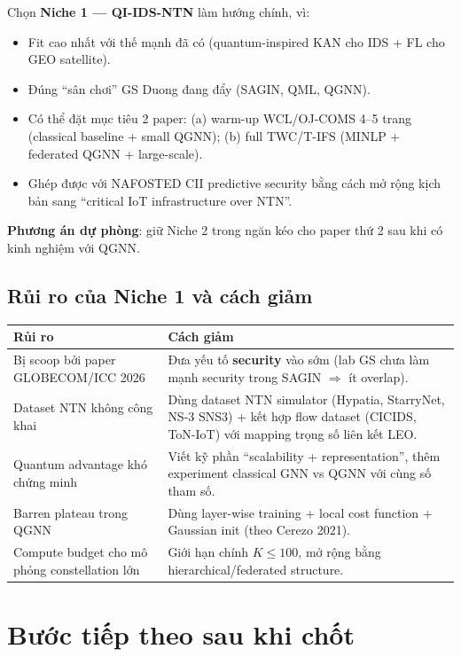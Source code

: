 \documentclass[11pt,a4paper]{article}
\begin{document}
\begin{greenbox}
Chọn \textbf{Niche 1 --- QI-IDS-NTN} làm hướng chính, vì:
\begin{itemize}
  \item Fit cao nhất với thế mạnh đã có (quantum-inspired KAN cho IDS + FL cho GEO satellite).
  \item Đúng ``sân chơi'' GS Duong đang đẩy (SAGIN, QML, QGNN).
  \item Có thể đặt mục tiêu 2 paper: (a) warm-up WCL/OJ-COMS 4--5 trang (classical baseline + small QGNN); (b) full TWC/T-IFS (MINLP + federated QGNN + large-scale).
  \item Ghép được với NAFOSTED CII predictive security bằng cách mở rộng kịch bản sang ``critical IoT infrastructure over NTN''.
\end{itemize}

\textbf{Phương án dự phòng}: giữ Niche 2 trong ngăn kéo cho paper thứ 2 sau khi có kinh nghiệm với QGNN.
\end{greenbox}

\subsection{Rủi ro của Niche 1 và cách giảm}

\begin{longtable}{@{}p{5cm} p{10cm}@{}}
\toprule
\textbf{Rủi ro} & \textbf{Cách giảm} \\
\midrule
\endhead
Bị scoop bởi paper GLOBECOM/ICC 2026 & Đưa yếu tố \textbf{security} vào sớm (lab GS chưa làm mạnh security trong SAGIN $\Rightarrow$ ít overlap). \\
Dataset NTN không công khai & Dùng dataset NTN simulator (Hypatia, StarryNet, NS-3 SNS3) + kết hợp flow dataset (CICIDS, ToN-IoT) với mapping trọng số liên kết LEO. \\
Quantum advantage khó chứng minh & Viết kỹ phần ``scalability + representation'', thêm experiment classical GNN vs QGNN với cùng số tham số. \\
Barren plateau trong QGNN & Dùng layer-wise training + local cost function + Gaussian init (theo Cerezo 2021). \\
Compute budget cho mô phỏng constellation lớn & Giới hạn chính $K \leq 100$, mở rộng bằng hierarchical/federated structure. \\
\bottomrule
\end{longtable}

\section{Bước tiếp theo sau khi chốt}
\end{document}
